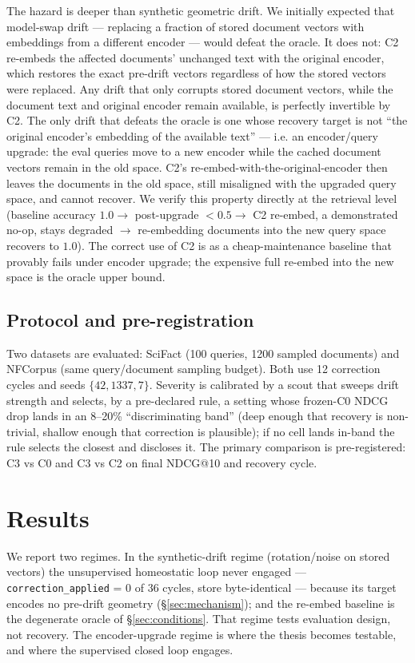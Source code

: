 \documentclass[12pt]{article}
\begin{document}
The hazard is deeper than synthetic geometric drift. We initially expected that model-swap drift --- replacing a fraction of stored document vectors with embeddings from a different encoder --- would defeat the oracle. It does not: C2 re-embeds the affected documents' unchanged text with the original encoder, which restores the exact pre-drift vectors regardless of how the stored vectors were replaced. Any drift that only corrupts stored document vectors, while the document text and original encoder remain available, is perfectly invertible by C2. The only drift that defeats the oracle is one whose recovery target is not ``the original encoder's embedding of the available text'' --- i.e. an encoder/query upgrade: the eval queries move to a new encoder while the cached document vectors remain in the old space. C2's re-embed-with-the-original-encoder then leaves the documents in the old space, still misaligned with the upgraded query space, and cannot recover. We verify this property directly at the retrieval level (baseline accuracy $1.0 \to$ post-upgrade $< 0.5 \to$ C2 re-embed, a demonstrated no-op, stays degraded $\to$ re-embedding documents into the new query space recovers to $1.0$). The correct use of C2 is as a cheap-maintenance baseline that provably fails under encoder upgrade; the expensive full re-embed into the new space is the oracle upper bound.

\subsection{Protocol and pre-registration}
\label{sec:protocol}

Two datasets are evaluated: SciFact (100 queries, 1200 sampled documents) and NFCorpus (same query/document sampling budget). Both use 12 correction cycles and seeds $\{42, 1337, 7\}$. Severity is calibrated by a scout that sweeps drift strength and selects, by a pre-declared rule, a setting whose frozen-C0 NDCG drop lands in an 8--20\% ``discriminating band'' (deep enough that recovery is non-trivial, shallow enough that correction is plausible); if no cell lands in-band the rule selects the closest and discloses it. The primary comparison is pre-registered: C3 vs C0 and C3 vs C2 on final NDCG@10 and recovery cycle.

\section{Results}
\label{sec:results}

We report two regimes. In the synthetic-drift regime (rotation/noise on stored vectors) the unsupervised homeostatic loop never engaged --- \texttt{correction\_applied} = 0 of 36 cycles, store byte-identical --- because its target encodes no pre-drift geometry (\S\ref{sec:mechanism}); and the re-embed baseline is the degenerate oracle of \S\ref{sec:conditions}. That regime tests evaluation design, not recovery. The encoder-upgrade regime is where the thesis becomes testable, and where the supervised closed loop engages.
\end{document}
